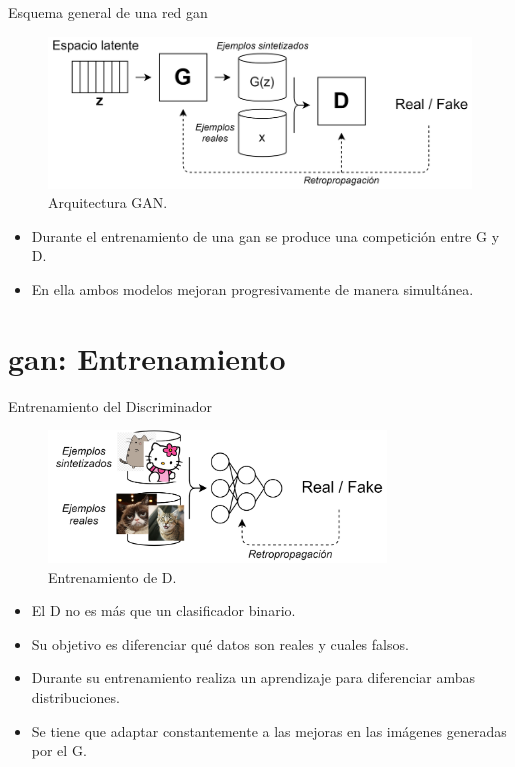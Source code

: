 \begin{frame}{Esquema general de una red \gls{gan}}
    
    \begin{figure}
        \centering
        \includegraphics[width=\textwidth]{Slides/figures/GAN/GAN architecture 2.png}
        \caption{Arquitectura GAN.}
    \end{figure}
    
    \begin{itemize}
        \item Durante el entrenamiento de una \gls{gan} se produce una \alert{competición} entre \alert{G} y \alert{D}.
        \item En ella ambos modelos mejoran \alert{progresivamente} de manera \alert{simultánea}.
    \end{itemize}
    
\end{frame}

\section{\gls{gan}: Entrenamiento}

\begin{frame}{Entrenamiento del Discriminador}
    
    \begin{figure}
        \centering
        \includegraphics[width=0.8\textwidth]{Slides/figures/GAN/Discriminador Iteracion.png}
        \caption{Entrenamiento de D.}
    \end{figure}
    
    \begin{itemize}
        \item El D no es más que un \alert{clasificador} binario.
        \item Su objetivo es \alert{diferenciar} qué datos son \alert{reales} y cuales \alert{falsos}.
        \item Durante su entrenamiento realiza un aprendizaje para diferenciar ambas \alert{distribuciones}.
        \item Se tiene que adaptar \alert{constantemente} a las mejoras en las imágenes generadas por el G.
    \end{itemize}
    
\end{frame}

